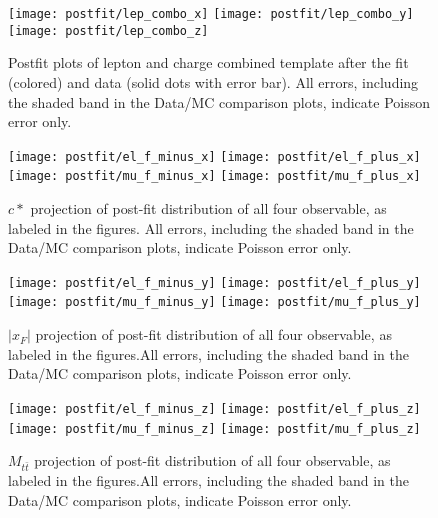 \documentclass{cmspaperpdf}
\begin{document}
\begin{figure}[hbt]
  \begin{center}
    \texttt{[image: postfit/lep\_combo\_x]}
    \texttt{[image: postfit/lep\_combo\_y]}
    \texttt{[image: postfit/lep\_combo\_z]}
  \caption{\small Postfit plots of lepton and charge combined template after the fit (colored) and data (solid dots with error bar). All errors, including the shaded band in the Data/MC comparison plots, indicate Poisson error only.}
    \label{fig:postfit combined}
  \end{center}
\end{figure}

\begin{figure}[hbt]
  \begin{center}
    \texttt{[image: postfit/el\_f\_minus\_x]}
    \texttt{[image: postfit/el\_f\_plus\_x]}
    \texttt{[image: postfit/mu\_f\_minus\_x]}
    \texttt{[image: postfit/mu\_f\_plus\_x]}
  \caption{\small $c*$ projection of post-fit distribution of all four observable, as labeled in the figures. All errors, including the shaded band in the Data/MC comparison plots, indicate Poisson error only.}
    \label{fig:postfit c*}
  \end{center}
\end{figure}

\begin{figure}[hbt]
  \begin{center}
    \texttt{[image: postfit/el\_f\_minus\_y]}
    \texttt{[image: postfit/el\_f\_plus\_y]}
    \texttt{[image: postfit/mu\_f\_minus\_y]}
    \texttt{[image: postfit/mu\_f\_plus\_y]}
  \caption{\small $|x_F|$ projection of post-fit distribution of all four observable, as labeled in the figures.All errors, including the shaded band in the Data/MC comparison plots, indicate Poisson error only.}
    \label{fig:postfit xf}
  \end{center}
\end{figure}

\begin{figure}[hbt]
  \begin{center}
    \texttt{[image: postfit/el\_f\_minus\_z]}
    \texttt{[image: postfit/el\_f\_plus\_z]}
    \texttt{[image: postfit/mu\_f\_minus\_z]}
    \texttt{[image: postfit/mu\_f\_plus\_z]}
  \caption{\small $M_{t\bar t}$ projection of post-fit distribution of all four observable, as labeled in the figures.All errors, including the shaded band in the Data/MC comparison plots, indicate Poisson error only.}
    \label{fig:postfit mtt}
  \end{center}
\end{figure}
\end{document}
